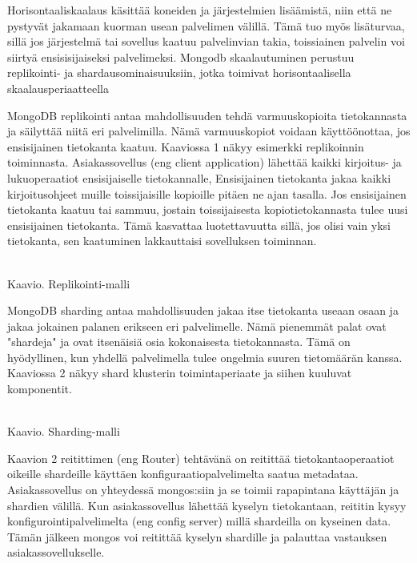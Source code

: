 Horisontaaliskaalaus käsittää koneiden ja järjestelmien lisäämistä, niin että ne pystyvät jakamaan kuorman usean palvelimen välillä.
Tämä tuo myös lisäturvaa, sillä jos järjestelmä tai sovellus kaatuu palvelinvian takia, 
toissiainen palvelin voi siirtyä ensisisijaiseksi palvelimeksi. 
Mongodb skaalautuminen perustuu replikointi- ja shardausominaisuuksiin, jotka toimivat horisontaalisella skaalausperiaatteella 
\medskip




MongoDB replikointi antaa mahdollisuuden tehdä varmuuskopioita tietokannasta ja säilyttää niitä eri palvelimilla.
Nämä varmuuskopiot voidaan käyttöönottaa, jos ensisijainen tietokanta kaatuu. 
Kaaviossa 1 näkyy esimerkki replikoinnin toiminnasta. 
Asiakassovellus (eng client application) lähettää kaikki kirjoitus- ja lukuoperaatiot ensisijaiselle tietokannalle, 
Ensisijainen tietokanta jakaa kaikki kirjoitusohjeet muille toissijaisille kopioille pitäen ne ajan tasalla.
Jos ensisijainen tietokanta kaatuu tai sammuu, jostain toissijaisesta kopiotietokannasta tulee uusi ensisijainen tietokanta.
Tämä kasvattaa luotettavuutta sillä, jos olisi vain yksi tietokanta, sen kaatuminen lakkauttaisi sovelluksen toiminnan. 
\medskip
\bigskip

\\
Kaavio\getChartCount{}. Replikointi-malli 
\medskip



MongoDB sharding antaa mahdollisuuden jakaa itse tietokanta useaan osaan ja jakaa jokainen palanen erikseen eri palvelimelle.
Nämä pienemmät palat ovat "shardeja"{} ja ovat itsenäisiä osia kokonaisesta tietokannasta.
Tämä on hyödyllinen, kun yhdellä palvelimella tulee ongelmia suuren tietomäärän kanssa.
Kaaviossa 2 näkyy shard klusterin toimintaperiaate ja siihen kuuluvat komponentit. 
\medskip



\bigskip
\\
Kaavio\getChartCount{}. Sharding-malli 
\medskip




Kaavion 2 reitittimen (eng Router) tehtävänä on reitittää tietokantaoperaatiot oikeille shardeille käyttäen konfiguraatiopalvelimelta saatua metadataa.
Asiakassovellus on yhteydessä mongos:siin ja se toimii rapapintana käyttäjän ja shardien välillä. 
Kun asiakassovellus lähettää kyselyn tietokantaan, reititin kysyy konfigurointipalvelimelta (eng config server) millä shardeilla on kyseinen data. 
Tämän jälkeen mongos voi reitittää kyselyn shardille ja palauttaa vastauksen asiakassovellukselle.
\medskip

